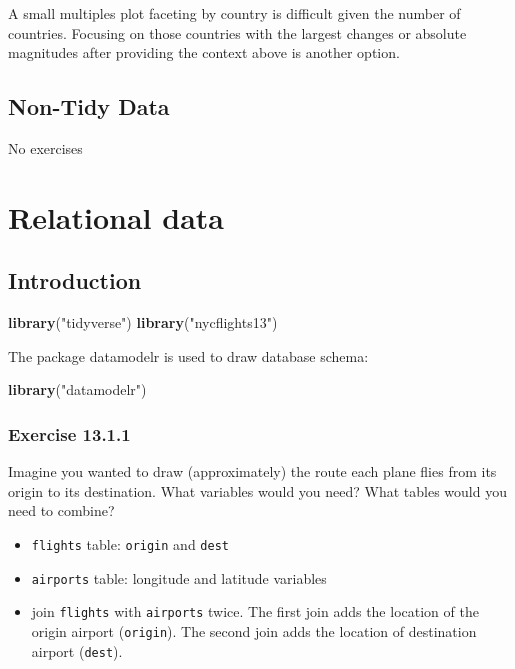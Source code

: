 \documentclass[]{book}
\newenvironment{Shaded}{\begin{snugshade}}{\end{snugshade}}
\newcommand{\KeywordTok}[1]{\textcolor[rgb]{0.13,0.29,0.53}{\textbf{#1}}}
\newcommand{\NormalTok}[1]{#1}
\newcommand{\StringTok}[1]{\textcolor[rgb]{0.31,0.60,0.02}{#1}}
\providecommand{\tightlist}{%
  \setlength{\itemsep}{0pt}\setlength{\parskip}{0pt}}
\theoremstyle{plain}
\theoremstyle{remark}
\theoremstyle{definition}
\theoremstyle{definition}
\theoremstyle{definition}
\theoremstyle{remark}
\begin{document}
A small multiples plot faceting by country is difficult given the number
of countries. Focusing on those countries with the largest changes or
absolute magnitudes after providing the context above is another option.

\hypertarget{non-tidy-data}{%
\section{Non-Tidy Data}\label{non-tidy-data}}

No exercises

\hypertarget{relational-data}{%
\chapter{Relational data}\label{relational-data}}

\hypertarget{introduction-8}{%
\section{Introduction}\label{introduction-8}}

\begin{Shaded}
\begin{Highlighting}[]
\KeywordTok{library}\NormalTok{(}\StringTok{"tidyverse"}\NormalTok{)}
\KeywordTok{library}\NormalTok{(}\StringTok{"nycflights13"}\NormalTok{)}
\end{Highlighting}
\end{Shaded}

The package datamodelr is used to draw database schema:

\begin{Shaded}
\begin{Highlighting}[]
\KeywordTok{library}\NormalTok{(}\StringTok{"datamodelr"}\NormalTok{)}
\end{Highlighting}
\end{Shaded}

\hypertarget{exercise-13.1.1}{%
\subsection*{\texorpdfstring{Exercise
{13.1.1}}{Exercise 13.1.1}}\label{exercise-13.1.1}}

Imagine you wanted to draw (approximately) the route each plane flies
from its origin to its destination. What variables would you need? What
tables would you need to combine?

\begin{itemize}
\tightlist
\item
  \texttt{flights} table: \texttt{origin} and \texttt{dest}
\item
  \texttt{airports} table: longitude and latitude variables
\item
  join \texttt{flights} with \texttt{airports} twice. The first join
  adds the location of the origin airport (\texttt{origin}). The second
  join adds the location of destination airport (\texttt{dest}).
\end{itemize}
\end{document}
